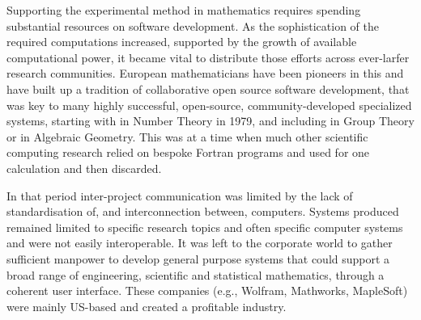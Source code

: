 Supporting the experimental method in mathematics requires spending
substantial resources
on software development. As the sophistication of the required
computations increased, supported by the growth of available
computational power, it became vital to distribute those efforts across
ever-larfer research communities. European mathematicians have been
pioneers in this and have built up a tradition of collaborative open
source software development, that was key
to many highly successful,
open-source, community-developed specialized systems, starting with
\PariGP in Number Theory in 1979, and including \GAP in Group Theory
or \Singular in Algebraic Geometry. This was at a time when much other
scientific computing research relied on bespoke Fortran programs and used
for one calculation and then discarded.
%



In that period inter-project communication was limited by the lack of
standardisation of, and interconnection between, computers. Systems
produced remained limited
to specific research topics and often specific computer systems and
were not easily interoperable. It was left to the
corporate world to gather sufficient manpower to develop general
purpose systems that could support a broad range of engineering,
scientific and statistical mathematics, through a coherent user
interface. These companies (e.g., Wolfram, Mathworks, MapleSoft) were
mainly US-based and created a profitable industry.



